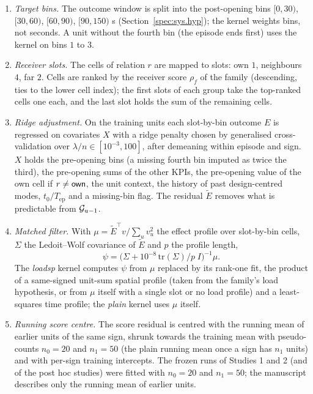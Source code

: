 \begin{enumerate}
\item \emph{Target bins.} The outcome window is split into the post-opening bins $[0,30)$, $[30,60)$, $[60,90)$, $[90,150)$ s (Section~\ref{spec:sys.hyp}); the kernel weights bins, not seconds. A unit without the fourth bin (the episode ends first) uses the kernel on bins $1$ to $3$.
\item \emph{Receiver slots.} The cells of relation $r$ are mapped to slots: own $1$, neighbours $4$, far $2$. Cells are ranked by the receiver score $\rho_f$ of the family (descending, ties to the lower cell index); the first slots of each group take the top-ranked cells one each, and the last slot holds the sum of the remaining cells.
\item \emph{Ridge adjustment.} On the training units each slot-by-bin outcome $E$ is regressed on covariates $X$ with a ridge penalty chosen by generalised cross-validation over $\lambda/n \in [10^{-3}, 100]$, after demeaning within episode and sign. $X$ holds the pre-opening bins (a missing fourth bin imputed as twice the third), the pre-opening sums of the other KPIs, the pre-opening value of the own cell if $r \neq \mathsf{own}$, the unit context, the history of past design-centred modes, $t_0/T_{\mathrm{ep}}$ and a missing-bin flag. The residual $\tilde E$ removes what is predictable from $\mathcal{G}_{u-1}$.
\item \emph{Matched filter.} With $\mu = \tilde E^\top v / \sum_u v_u^2$ the effect profile over slot-by-bin cells, $\Sigma$ the Ledoit--Wolf covariance of $\tilde E$ and $p$ the profile length,
\begin{equation*}
\psi = \bigl(\Sigma + 10^{-8}\, \mathrm{tr}(\Sigma)/p\; I\bigr)^{-1} \mu .
\end{equation*}
The \emph{loadsp} kernel computes $\psi$ from $\mu$ replaced by its rank-one fit, the product of a same-signed unit-sum spatial profile (taken from the family's load hypothesis, or from $\mu$ itself with a single slot or no load profile) and a least-squares time profile; the \emph{plain} kernel uses $\mu$ itself.
\item \emph{Running score centre.} The score residual is centred with the running mean of earlier units of the same sign, shrunk towards the training mean with pseudo-counts $n_0 = 20$ and $n_1 = 50$ (the plain running mean once a sign has $n_1$ units) and with per-sign training intercepts. The frozen runs of Studies 1 and 2 (and of the post hoc studies) were fitted with $n_0 = 20$ and $n_1 = 50$; the manuscript describes only the running mean of earlier units.

\end{enumerate}

